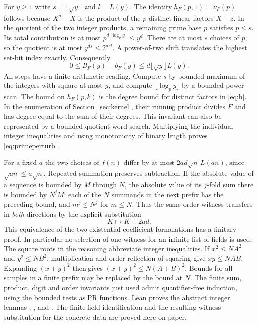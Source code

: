 For $y\ge1$ write $s=\lfloor\sqrt y\rfloor$ and $l=L(y)$. The identity $h_F(p,1)=\nu_F(p)$ follows because $X^p-X$ is the product of the $p$ distinct linear factors $X-z$. In the quotient of the two integer products, a remaining prime base $p$ satisfies $p\le s$. Its total contribution is at most
$p^{d\lfloor\log_p y\rfloor}\le y^d$. There are at most $s$ choices of $p$, so the quotient is at most $y^{ds}\le 2^{dsl}$. A power-of-two shift translates the highest set-bit index exactly. Consequently
\begin{equation}\label{eq:primeperturb}
                  0\le B_F(y)-b_F(y)\le d\lfloor\sqrt y\rfloor L(y).
\end{equation}
All steps have a finite arithmetic reading. Compute $s$ by bounded maximum of the integers with square at most $y$, and compute $\lfloor\log_p y\rfloor$ by a bounded power scan. The bound on $h_F(p,k)$ is the degree bound for distinct factors in \eqref{eq:h}. In the enumeration of Section~\ref{sec:kernel}, their running product divides $\overline F$ and has degree equal to the sum of their degrees. This invariant can also be represented by a bounded quotient-word search. Multiplying the individual integer inequalities and using monotonicity of binary length proves \eqref{eq:primeperturb}.

For a fixed $a$ the two choices of $f(n)$ differ by at most
$2ad\sqrt n\,L(an)$, since $\sqrt{an}\le a\sqrt n$. Repeated summation preserves subtraction. If the absolute value of a sequence is bounded by $M$ through $N$, the absolute value of its $j$-fold sum there is bounded by $N^j M$: each of the $N$ summands in the next prefix has the preceding bound, and $m^j\le N^j$ for $m\le N$. Thus the same-order witness transfers in \emph{both} directions by the explicit substitution
\[
                         K\longmapsto K+2ad.
\]
This equivalence of the two existential-coefficient formulations has a finitary proof. In particular no selection of one witness for an infinite list of fields is used. The square roots in the reasoning abbreviate integer inequalities. If $x^2\le NA^2$ and $y^2\le NB^2$, multiplication and order reflection of squaring give $xy\le NAB$. Expanding $(x+y)^2$ then gives $(x+y)^2\le N(A+B)^2$. Bounds for all samples in a finite prefix may be replaced by the bound at $N$. The finite sum, product, digit and order invariants just used admit quantifier-free induction, using the bounded tests as PR functions. Lean proves the abstract integer lemmas , ,  and . The finite-field identification and the resulting witness substitution for the concrete data are proved here on paper.

